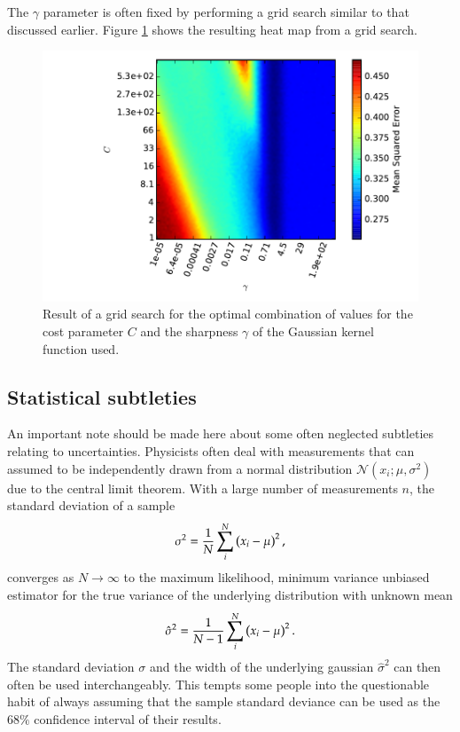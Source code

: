 The $\gamma$ parameter is often fixed by performing a grid search similar to that discussed earlier. Figure \ref{fig:grid_search_gamma_c} shows the resulting heat map from a grid search.
\begin{figure}
	\centering
	\includegraphics[width = \figwidth]{pics/ml/grid_search_svr_gamma_c.pdf}
	\caption{Result of a grid search for the optimal combination of values for the cost parameter $C$ and the sharpness $\gamma$ of the Gaussian kernel function used.}
	\label{fig:grid_search_gamma_c}
\end{figure}

\FloatBarrier
\subsection{Statistical subtleties}
An important note should be made here about some often neglected subtleties relating to uncertainties. Physicists often deal with measurements that can assumed to be independently drawn from a normal distribution $\mathcal{N}(x_i;\mu, \sigma^2)$ due to the central limit theorem. With a large number of measurements $n$, the standard deviation of a sample
\begin{equation}
	\sigma^2 = \frac{1}{N}\sum_i^N \left( x_i - \mu \right)^2,
\end{equation}
converges as $N \rightarrow \infty$ to the maximum likelihood, minimum variance unbiased estimator for the true variance of the underlying distribution with unknown mean
\begin{equation}
	\hat{\sigma}^2 = \frac{1}{N-1} \sum_i^N \left( x_i - \mu \right)^2.
\end{equation}
The standard deviation $\sigma$ and the width of the underlying gaussian $\hat{\sigma}^2$ can then often be used interchangeably. This tempts some people into the questionable habit of always assuming that the sample standard deviance can be used as the $68\%$ confidence interval of their results.

